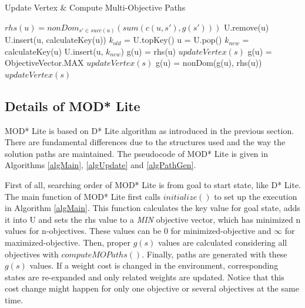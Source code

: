 \documentclass[10pt,journal]{IEEEtran}
\begin{document}
\begin{algorithm}
	\caption{Update Vertex \& Compute Multi-Objective Paths}
	\label{algUpdate}
    \begin{algorithmic}[1]
   	  		\State $rhs(u) = nonDom_{s' \in succ(u)}(sum(c(u,s'), g(s')))$
   	  	\EndIf
   	  	 U.remove(u) \EndIf
   	  		\State U.insert(u, calculateKey(u))
   	  	\EndIf
   	  \EndFunction
    	  \Statex
			\State $k_{old}$ = U.topKey()
	      	\State u = U.pop()
	      	\State $k_{new}$ = calculateKey(u)
	      		\State U.insert(u, $k_{new}$)
	      		\State g(u) = rhs(u)
	      		 $updateVertex(s)$ \EndFor
	      		\State g(u) = ObjectiveVector.MAX
	      		 $updateVertex(s)$ \EndFor
	      	\Else
	      		\State g(u) = nonDom(g(u), rhs(u))
	      		 $updateVertex(s)$ \EndFor
	      	\EndIf
		\EndWhile
	  \EndFunction
	\end{algorithmic}
\end{algorithm}

\subsection{Details of MOD* Lite}
MOD* Lite is based on  D* Lite algorithm as introduced in the previous section. There are fundamental differences due to the structures used and the way the solution paths are maintained. The pseudocode of MOD* Lite is given in Algorithms \ref{algMain}, \ref{algUpdate} and \ref{algPathGen}.

First of all, searching order of MOD* Lite is from goal to start state, like D* Lite. The main function of MOD* Lite first calls $initialize()$ to set up the execution in Algorithm \ref{algMain}. This function calculates the key value for goal state, adds it into U and sets the rhs value to a \textit{MIN} objective vector, which has minimized n values for n-objectives. These values can be $0$ for minimized-objective and $\infty$ for maximized-objective. Then, proper $g(s)$ values are calculated considering all objectives with $computeMOPaths()$. Finally, paths are generated with these $g(s)$ values. If a weight cost is changed in the environment, corresponding states are re-expanded and only related weights are updated. Notice that this cost change might happen for only one objective or several objectives at the same time.
\end{document}
